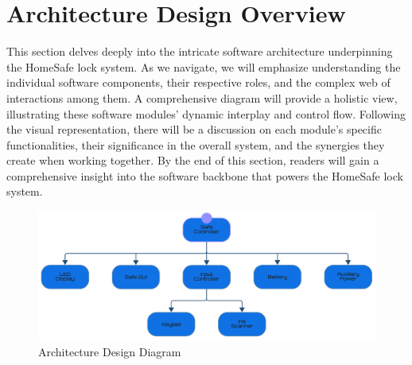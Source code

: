 \documentclass{article}
\begin{document}
\section{Architecture Design Overview}
This section delves deeply into the intricate software architecture underpinning the HomeSafe lock system. As we navigate, we will emphasize understanding the individual software components, their respective roles, and the complex web of interactions among them. A comprehensive diagram will provide a holistic view, illustrating these software modules' dynamic interplay and control flow. Following the visual representation, there will be a discussion on each module's specific functionalities, their significance in the overall system, and the synergies they create when working together. By the end of this section, readers will gain a comprehensive insight into the software backbone that powers the HomeSafe lock system.

\begin{figure}[h]
    \centering
    \includegraphics[scale=0.3]{docs/figs/architecture_design.png}
    \caption{Architecture Design Diagram \cite{lucidLucidVisual}}
    \label{fig:diagram1}
\end{figure}
\end{document}

